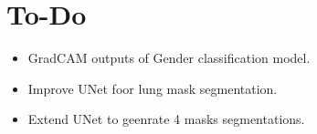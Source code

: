 \section{To-Do}

\begin{itemize}
    \item GradCAM outputs of Gender classification model.
    \item Improve UNet foor lung mask segmentation.
    \item Extend UNet to geenrate 4 masks segmentations. 
\end{itemize}